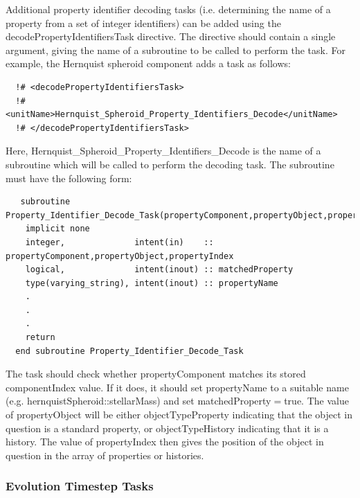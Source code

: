 Additional property identifier decoding tasks (i.e. determining the name of a property from a set of integer identifiers) can be added using the {\normalfont \ttfamily decodePropertyIdentifiersTask} directive. The directive should contain a single argument, giving the name of a subroutine to be called to perform the task. For example, the Hernquist spheroid component adds a task as follows:
\begin{verbatim}
  !# <decodePropertyIdentifiersTask>
  !#  <unitName>Hernquist_Spheroid_Property_Identifiers_Decode</unitName>
  !# </decodePropertyIdentifiersTask>
\end{verbatim}
Here, {\normalfont \ttfamily Hernquist\_Spheroid\_Property\_Identifiers\_Decode} is the name of a subroutine which will be called to perform the decoding task. The subroutine must have the following form:
\begin{verbatim}
   subroutine Property_Identifier_Decode_Task(propertyComponent,propertyObject,propertyIndex,matchedProperty,propertyName)
    implicit none
    integer,              intent(in)    :: propertyComponent,propertyObject,propertyIndex
    logical,              intent(inout) :: matchedProperty
    type(varying_string), intent(inout) :: propertyName
    .
    .
    .
    return
  end subroutine Property_Identifier_Decode_Task
\end{verbatim}
The task should check whether {\normalfont \ttfamily propertyComponent} matches its stored {\normalfont \ttfamily componentIndex} value. If it does, it should set {\normalfont \ttfamily propertyName} to a suitable name (e.g. {\normalfont \ttfamily hernquistSpheroid::stellarMass}) and set {\normalfont \ttfamily matchedProperty}$=${\normalfont \ttfamily true}. The value of {\normalfont \ttfamily propertyObject} will be either {\normalfont \ttfamily objectTypeProperty} indicating that the object in question is a standard property, or {\normalfont \ttfamily objectTypeHistory} indicating that it is a history. The value of {\normalfont \ttfamily propertyIndex} then gives the position of the object in question in the array of properties or histories.

\subsubsection{Evolution Timestep Tasks}

